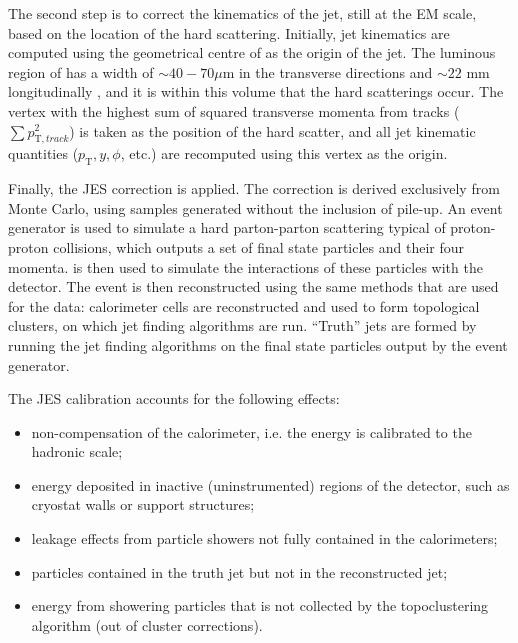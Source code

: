 The second step is to correct the kinematics of the jet, still at the EM scale, based on the location of the hard scattering. Initially, jet kinematics are computed using the geometrical centre of \atlas as the origin of the jet. The luminous region of \atlas has a width of $\sim 40-70 \mu \mathrm{m}$ in the transverse directions and $\sim 22$ mm longitudinally \cite{beamspot_2010}, and it is within this volume that the hard scatterings occur. The vertex with the highest sum of squared transverse momenta from tracks ($\sum p_{\mathrm{T},track}^2$) is taken as the position of the hard scatter, and all jet kinematic quantities ($p_\mathrm{T},y,\phi$, etc.) are recomputed using this vertex as the origin. 

Finally, the JES correction is applied. The correction is derived exclusively from Monte Carlo, using samples generated without the inclusion of pile-up. An event generator is used to simulate a hard parton-parton scattering typical of proton-proton collisions, which outputs a set of final state particles and their four momenta. \geant is then used to simulate the interactions of these particles with the detector. The event is then reconstructed using the same methods that are used for the data: calorimeter cells are reconstructed and used to form topological clusters, on which jet finding algorithms are run. ``Truth'' jets are formed by running the jet finding algorithms on the final state particles output by the event generator. 

The JES calibration accounts for the following effects:
\begin{itemize}
\item{} non-compensation of the calorimeter, i.e. the energy is calibrated to the hadronic scale;
\item{} energy deposited in inactive (uninstrumented) regions of the detector, such as cryostat walls or support structures;
\item{} leakage effects from particle showers not fully contained in the calorimeters;
\item{} particles contained in the truth jet but not in the reconstructed jet;
\item{} energy from showering particles that is not collected by the topoclustering algorithm (out of cluster corrections).
\end{itemize}

